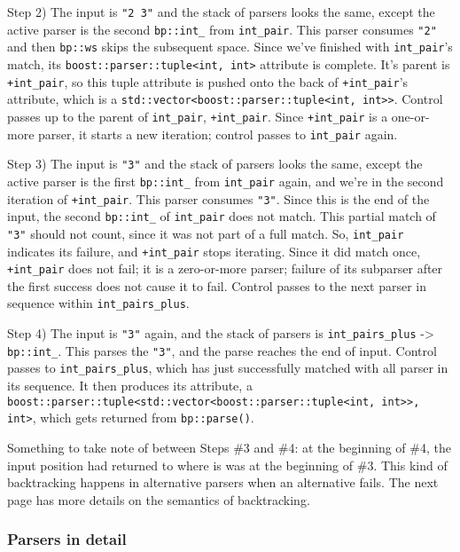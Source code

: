 Step 2) The input is \texttt{"2 3"} and the stack of parsers looks the same, except the active parser is the second \texttt{bp::int\_} from \texttt{int\_pair}. This parser consumes \texttt{"2"} and then \texttt{bp::ws} skips the subsequent space. Since we've finished with \texttt{int\_pair}'s match, its \texttt{boost::parser::tuple<int, int>} attribute is complete. It's parent is \texttt{+int\_pair}, so this tuple attribute is pushed onto the back of \texttt{+int\_pair}'s attribute, which is a \texttt{std::vector<boost::parser::tuple<int, int>>}. Control passes up to the parent of \texttt{int\_pair}, \texttt{+int\_pair}. Since \texttt{+int\_pair} is a one-or-more parser, it starts a new iteration; control passes to \texttt{int\_pair} again.

Step 3) The input is \texttt{"3"} and the stack of parsers looks the same, except the active parser is the first \texttt{bp::int\_} from \texttt{int\_pair} again, and we're in the second iteration of \texttt{+int\_pair}. This parser consumes \texttt{"3"}. Since this is the end of the input, the second \texttt{bp::int\_} of \texttt{int\_pair} does not match. This partial match of \texttt{"3"} should not count, since it was not part of a full match. So, \texttt{int\_pair} indicates its failure, and \texttt{+int\_pair} stops iterating. Since it did match once, \texttt{+int\_pair} does not fail; it is a zero-or-more parser; failure of its subparser after the first success does not cause it to fail. Control passes to the next parser in sequence within \texttt{int\_pairs\_plus}.

Step 4) The input is \texttt{"3"} again, and the stack of parsers is \texttt{int\_pairs\_plus} -> \texttt{bp::int\_}. This parses the \texttt{"3"}, and the parse reaches the end of input. Control passes to \texttt{int\_pairs\_plus}, which has just successfully matched with all parser in its sequence. It then produces its attribute, a \texttt{boost::parser::tuple<std::vector<boost::parser::tuple<int, int>>, int>}, which gets returned from \texttt{bp::parse()}.

Something to take note of between Steps \#3 and \#4: at the beginning of \#4, the input position had returned to where is was at the beginning of \#3. This kind of backtracking happens in alternative parsers when an alternative fails. The next page has more details on the semantics of backtracking.

\subsubsection{Parsers in detail}

